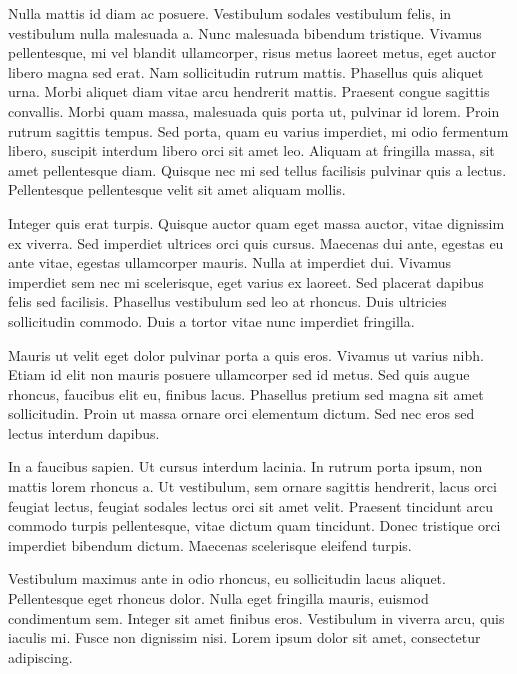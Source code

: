 Nulla mattis id diam ac posuere. Vestibulum sodales vestibulum felis, in vestibulum nulla malesuada a. Nunc malesuada bibendum tristique. Vivamus pellentesque, mi vel blandit ullamcorper, risus metus laoreet metus, eget auctor libero magna sed erat. Nam sollicitudin rutrum mattis. Phasellus quis aliquet urna. Morbi aliquet diam vitae arcu hendrerit mattis. Praesent congue sagittis convallis. Morbi quam massa, malesuada quis porta ut, pulvinar id lorem. Proin rutrum sagittis tempus. Sed porta, quam eu varius imperdiet, mi odio fermentum libero, suscipit interdum libero orci sit amet leo. Aliquam at fringilla massa, sit amet pellentesque diam. Quisque nec mi sed tellus facilisis pulvinar quis a lectus. Pellentesque pellentesque velit sit amet aliquam mollis.

Integer quis erat turpis. Quisque auctor quam eget massa auctor, vitae dignissim ex viverra. Sed imperdiet ultrices orci quis cursus. Maecenas dui ante, egestas eu ante vitae, egestas ullamcorper mauris. Nulla at imperdiet dui. Vivamus imperdiet sem nec mi scelerisque, eget varius ex laoreet. Sed placerat dapibus felis sed facilisis. Phasellus vestibulum sed leo at rhoncus. Duis ultricies sollicitudin commodo. Duis a tortor vitae nunc imperdiet fringilla.

Mauris ut velit eget dolor pulvinar porta a quis eros. Vivamus ut varius nibh. Etiam id elit non mauris posuere ullamcorper sed id metus. Sed quis augue rhoncus, faucibus elit eu, finibus lacus. Phasellus pretium sed magna sit amet sollicitudin. Proin ut massa ornare orci elementum dictum. Sed nec eros sed lectus interdum dapibus.

In a faucibus sapien. Ut cursus interdum lacinia. In rutrum porta ipsum, non mattis lorem rhoncus a. Ut vestibulum, sem ornare sagittis hendrerit, lacus orci feugiat lectus, feugiat sodales lectus orci sit amet velit. Praesent tincidunt arcu commodo turpis pellentesque, vitae dictum quam tincidunt. Donec tristique orci imperdiet bibendum dictum. Maecenas scelerisque eleifend turpis.

Vestibulum maximus ante in odio rhoncus, eu sollicitudin lacus aliquet. Pellentesque eget rhoncus dolor. Nulla eget fringilla mauris, euismod condimentum sem. Integer sit amet finibus eros. Vestibulum in viverra arcu, quis iaculis mi. Fusce non dignissim nisi. Lorem ipsum dolor sit amet, consectetur adipiscing. 
